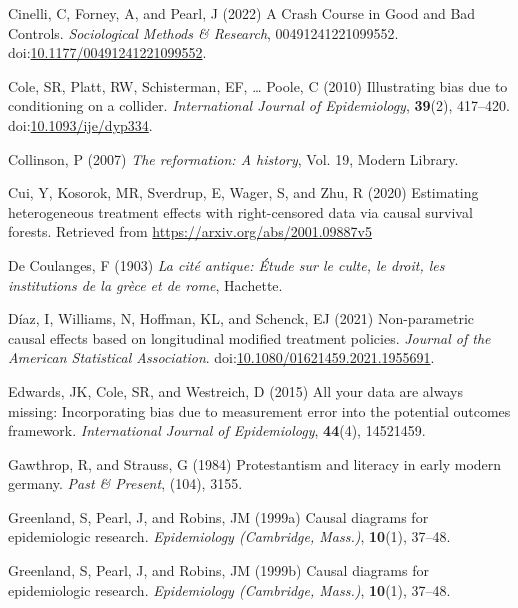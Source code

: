 \documentclass[
  singlecolumn,
  9pt]{article}
\begin{document}
\begin{CSLReferences}
Cinelli, C, Forney, A, and Pearl, J (2022) A Crash Course in Good and
Bad Controls. \emph{Sociological Methods \& Research},
00491241221099552.
doi:\href{https://doi.org/10.1177/00491241221099552}{10.1177/00491241221099552}.

Cole, SR, Platt, RW, Schisterman, EF, \ldots{} Poole, C (2010)
Illustrating bias due to conditioning on a collider. \emph{International
Journal of Epidemiology}, \textbf{39}(2), 417--420.
doi:\href{https://doi.org/10.1093/ije/dyp334}{10.1093/ije/dyp334}.

Collinson, P (2007) \emph{The reformation: A history}, Vol. 19, Modern
Library.

Cui, Y, Kosorok, MR, Sverdrup, E, Wager, S, and Zhu, R (2020) Estimating
heterogeneous treatment effects with right-censored data via causal
survival forests. Retrieved from
\url{https://arxiv.org/abs/2001.09887v5}

De Coulanges, F (1903) \emph{La cité antique: Étude sur le culte, le
droit, les institutions de la grèce et de rome}, Hachette.

Díaz, I, Williams, N, Hoffman, KL, and Schenck, EJ (2021) Non-parametric
causal effects based on longitudinal modified treatment policies.
\emph{Journal of the American Statistical Association}.
doi:\href{https://doi.org/10.1080/01621459.2021.1955691}{10.1080/01621459.2021.1955691}.

Edwards, JK, Cole, SR, and Westreich, D (2015) All your data are always
missing: Incorporating bias due to measurement error into the potential
outcomes framework. \emph{International Journal of Epidemiology},
\textbf{44}(4), 14521459.

Gawthrop, R, and Strauss, G (1984) Protestantism and literacy in early
modern germany. \emph{Past \& Present}, (104), 3155.

Greenland, S, Pearl, J, and Robins, JM (1999a) Causal diagrams for
epidemiologic research. \emph{Epidemiology (Cambridge, Mass.)},
\textbf{10}(1), 37--48.

Greenland, S, Pearl, J, and Robins, JM (1999b) Causal diagrams for
epidemiologic research. \emph{Epidemiology (Cambridge, Mass.)},
\textbf{10}(1), 37--48.


\end{CSLReferences}
\end{document}
